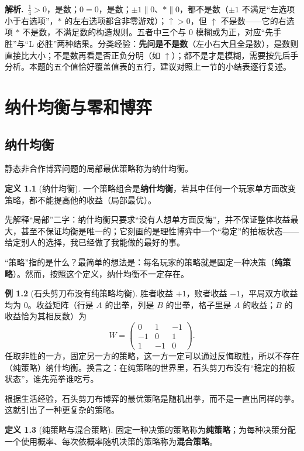 \documentclass[UTF8,a4paper,11pt,oneside,openany,fontset=fandol]{ctexbook}
\theoremstyle{definition}
\newtheorem{definition}{定义}[chapter]
\newtheorem{example}[definition]{例}
\newcommand{\sol}{\par\noindent\textbf{解析.}\ }
\begin{document}
\sol $\tfrac14>0$，是数；$0=0$，是数；$\pm1\parallel0$、$\ast\parallel0$，都不是数（$\pm1$ 不满足“左选项小于右选项”，$\ast$ 的左右选项都含非零游戏）；$\uparrow>0$，但 $\uparrow$ 不是数——它的右选项 $\ast$ 不是数，不满足数的构造规则。五者中三个与 $0$ 模糊或为正，对应“先手胜”与“L 必胜”两种结果。分类经验：\textbf{先问是不是数}（左小右大且全是数），是数则直接比大小；不是数再看是否正负分明（如 $\uparrow$）；都不是才是模糊，需要按先后手分析。本题的五个值恰好覆盖值表的五行，建议对照上一节的小结表逐行复述。



\chapter{纳什均衡与零和博弈}
\section{纳什均衡}
静态非合作博弈问题的局部最优策略称为纳什均衡。

\begin{definition}[纳什均衡]
一个策略组合是\textbf{纳什均衡}，若其中任何一个玩家单方面改变策略，都不能提高他的收益（局部最优）。
\end{definition}

先解释“局部”二字：纳什均衡只要求“没有人想单方面反悔”，并不保证整体收益最大，甚至不保证均衡是唯一的；它刻画的是理性博弈中一个“稳定”的拍板状态——给定别人的选择，我已经做了我能做的最好的事。

“策略”指的是什么？最简单的想法是：每名玩家的策略就是固定一种决策（\textbf{纯策略}）。然而，按照这个定义，纳什均衡不一定存在。

\begin{example}[石头剪刀布没有纯策略均衡]
胜者收益 $+1$，败者收益 $-1$，平局双方收益均为 $0$。收益矩阵（行是 $A$ 的出拳，列是 $B$ 的出拳，格子里是 $A$ 的收益；$B$ 的收益恰为其相反数）为
\[
 W=\begin{pmatrix}0&1&-1\\-1&0&1\\1&-1&0\end{pmatrix}.
\]
任取非胜的一方，固定另一方的策略，这一方一定可以通过反悔取胜，所以不存在（纯策略）纳什均衡。换言之：在纯策略的世界里，石头剪刀布没有“稳定的拍板状态”，谁先亮拳谁吃亏。
\end{example}

根据生活经验，石头剪刀布博弈的最优策略是随机出拳，而不是一直出同样的拳。这就引出了一种更复杂的策略。

\begin{definition}[纯策略与混合策略]
固定一种决策的策略称为\textbf{纯策略}；为每种决策分配一个使用概率、每次依概率随机决策的策略称为\textbf{混合策略}。
\end{definition}
\end{document}

